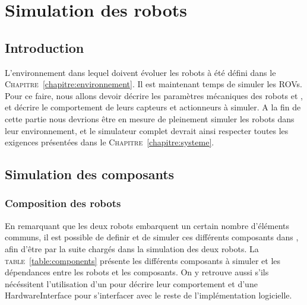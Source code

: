 \chapter{Simulation des robots}
\label{chapitre:robots}
	
	\section{Introduction}

		L'environnement dans lequel doivent évoluer les robots à été défini dans le \textsc{Chapitre}~\ref{chapitre:environnement}. Il est maintenant temps de simuler les \gls{ROV}s. Pour ce faire, nous allons devoir décrire les paramètres mécaniques des robots \argos{} et \atoll{}, et décrire le comportement de leurs capteurs et actionneurs à simuler. A la fin de cette partie nous devrions être en mesure de pleinement simuler les robots dans leur environnement, et le simulateur complet devrait ainsi respecter toutes les exigences présentées dans le \textsc{Chapitre}~\ref{chapitre:systeme}.

	\section{Simulation des composants}

		\subsection{Composition des robots}
			En remarquant que les deux robots embarquent un certain nombre d'éléments communs, il est possible de definir et de simuler ces différents composants dans \gazebo, afin d'être par la suite chargés dans la simulation des deux robots. La \textsc{table}~\ref{table:components} présente les différents composants à simuler et les dépendances entre les robots et les composants. On y retrouve aussi s'ils nécéssitent l'utilisation d'un \plugin{} \gazebo{} pour décrire leur comportement et d'une \gls{HardwareInterface} pour s'interfacer avec le reste de l'implémentation logicielle.

